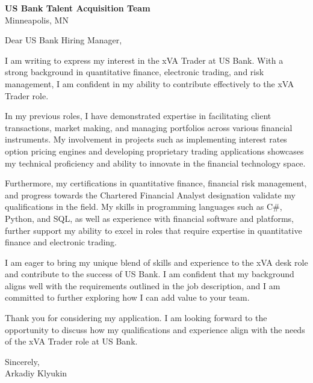 \documentclass{letter}
\begin{document}
\begin{letter}{\textbf{US Bank Talent Acquisition Team} \\
                Minneapolis, MN}


\opening{Dear US Bank Hiring Manager,}

I am writing to express my interest in the xVA Trader at US Bank. With a strong background in quantitative finance, electronic trading, and risk management, I am confident in my ability to contribute effectively to the xVA Trader role.

In my previous roles, I have demonstrated expertise in facilitating client transactions, market making, and managing portfolios across various financial instruments. My involvement in projects such as implementing interest rates option pricing engines and developing proprietary trading applications showcases my technical proficiency and ability to innovate in the financial technology space.

Furthermore, my certifications in quantitative finance, financial risk management, and progress towards the Chartered Financial Analyst designation validate my qualifications in the field. My skills in programming languages such as C\#, Python, and SQL, as well as experience with financial software and platforms, further support my ability to excel in roles that require expertise in quantitative finance and electronic trading.

I am eager to bring my unique blend of skills and experience to the xVA desk role and contribute to the success of US Bank. I am confident that my background aligns well with the requirements outlined in the job description, and I am committed to further exploring how I can add value to your team.

Thank you for considering my application. I am looking forward to the opportunity to discuss how my qualifications and experience align with the needs of the xVA Trader role at US Bank.

Sincerely,\\
Arkadiy Klyukin
\end{letter}
\end{document}
